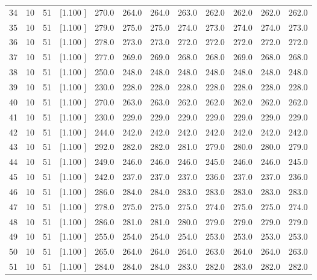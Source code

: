 \documentclass[12pt,a4paper]{article}
\begin{document}
\begin{center}
{\begin{tabular}{r r r r r r r r r r r r}
  34& 10& 51&[1.100     ]&   270.0&   264.0&   264.0&   263.0&   262.0&   262.0&   262.0&   262.0\\[-0.02in]
  35& 10& 51&[1.100     ]&   279.0&   275.0&   275.0&   274.0&   273.0&   274.0&   274.0&   273.0\\[-0.02in]
  36& 10& 51&[1.100     ]&   278.0&   273.0&   273.0&   272.0&   272.0&   272.0&   272.0&   272.0\\[-0.02in]
  37& 10& 51&[1.100     ]&   277.0&   269.0&   269.0&   268.0&   268.0&   269.0&   268.0&   268.0\\[-0.02in]
  38& 10& 51&[1.100     ]&   250.0&   248.0&   248.0&   248.0&   248.0&   248.0&   248.0&   248.0\\[-0.02in]
  39& 10& 51&[1.100     ]&   230.0&   228.0&   228.0&   228.0&   228.0&   228.0&   228.0&   228.0\\[-0.02in]
  40& 10& 51&[1.100     ]&   270.0&   263.0&   263.0&   262.0&   262.0&   262.0&   262.0&   262.0\\[-0.02in]
  41& 10& 51&[1.100     ]&   230.0&   229.0&   229.0&   229.0&   229.0&   229.0&   229.0&   229.0\\[-0.02in]
  42& 10& 51&[1.100     ]&   244.0&   242.0&   242.0&   242.0&   242.0&   242.0&   242.0&   242.0\\[-0.02in]
  43& 10& 51&[1.100     ]&   292.0&   282.0&   282.0&   281.0&   279.0&   280.0&   280.0&   279.0\\[-0.02in]
  44& 10& 51&[1.100     ]&   249.0&   246.0&   246.0&   246.0&   245.0&   246.0&   246.0&   245.0\\[-0.02in]
  45& 10& 51&[1.100     ]&   242.0&   237.0&   237.0&   237.0&   236.0&   237.0&   237.0&   236.0\\[-0.02in]
  46& 10& 51&[1.100     ]&   286.0&   284.0&   284.0&   283.0&   283.0&   283.0&   283.0&   283.0\\[-0.02in]
  47& 10& 51&[1.100     ]&   278.0&   275.0&   275.0&   275.0&   274.0&   275.0&   275.0&   274.0\\[-0.02in]
  48& 10& 51&[1.100     ]&   286.0&   281.0&   281.0&   280.0&   279.0&   279.0&   279.0&   279.0\\[-0.02in]
  49& 10& 51&[1.100     ]&   255.0&   254.0&   254.0&   254.0&   253.0&   253.0&   253.0&   253.0\\[-0.02in]
  50& 10& 51&[1.100     ]&   265.0&   264.0&   264.0&   264.0&   263.0&   264.0&   264.0&   263.0\\[-0.02in]
  51& 10& 51&[1.100     ]&   284.0&   284.0&   284.0&   283.0&   282.0&   283.0&   282.0&   282.0\\[-0.02in]

\end{tabular}}
\end{center}
\end{document}
